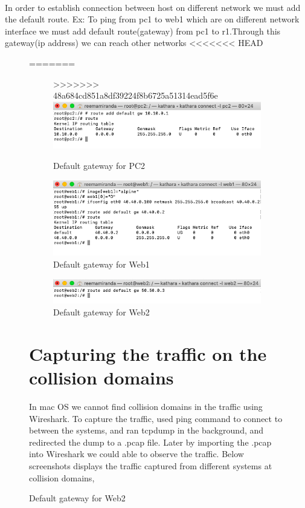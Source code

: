 \paragraph{}
In order to establish connection between host on different network we must add the default route. 
Ex: To ping from pc1 to web1 which are on different network interface we must add default route(gateway) from pc1 to r1.Through this gateway(ip address) we can reach other  networks 
<<<<<<< HEAD
\begin{figure}[H]
=======
\begin{figure}
>>>>>>> 48a684cd851a8df39224f8b6725a51314ead5f6e
\centering
  \includegraphics[width=400pt]{Images/pc2_gateway.png}
  \caption{Default gateway for PC2}
  \label{fig:2.19}
\end{figure}
\begin{figure}
\centering
  \includegraphics[width=400pt]{Images/web1_gateway.png}
  \caption{Default gateway for Web1}
  \label{fig:2.20}
\end{figure}
\begin{figure}
\centering
  \includegraphics[width=400pt]{Images/web2_gateway.png}
  \caption{Default gateway for Web2}
  \label{fig:2.21}
\end{figure}


\section{Capturing the traffic on the collision domains}
In mac OS we cannot find collision domains in the traffic using Wireshark. To capture the traffic, used ping command to connect to between the systems, and ran tcpdump in the background, and redirected the dump to a .pcap file. Later by importing the .pcap into Wireshark we could able to observe the traffic.
\newline Below screenshots displays the traffic captured from different systems at collision domains,

\end{figure}
